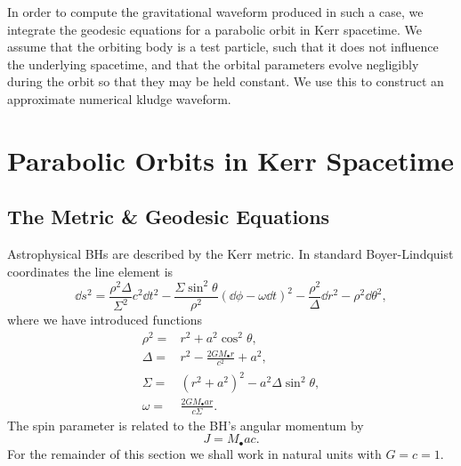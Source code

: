 In order to compute the gravitational waveform produced in such a case, we integrate the geodesic equations for a parabolic orbit in Kerr spacetime. We assume that the orbiting body is a test particle, such that it does not influence the underlying spacetime, and that the orbital parameters evolve negligibly during the orbit so that they may be held constant. We use this to construct an approximate numerical kludge waveform\cite{Babak2007}.

\section{Parabolic Orbits in Kerr Spacetime}

\subsection{The Metric \& Geodesic Equations}

Astrophysical BHs are described by the Kerr metric\cite{Kerr1963}. In standard Boyer-Lindquist coordinates the line element is\cite{Boyer1967, Hobson2006}
\begin{equation}
\dd s^2 = \frac{\rho^2 \Delta}{\Sigma^2}c^2\dd t^2 - \frac{\Sigma \sin^2 \theta}{\rho^2}\left(\dd \phi - \omega \dd t\right)^2 - \frac{\rho^2}{\Delta}\dd r^2 - \rho^2\dd \theta^2,
\end{equation}
where we have introduced functions
\begin{align}
\rho^2 = {} & r^2 + a^2\cos^2\theta,\\
\Delta = {} & r^2 - \frac{2GM_\bullet r}{c^2} + a^2,\\
\Sigma = {} & \left(r^2 +a^2\right)^2 - a^2\Delta\sin^2\theta,\\
\omega = {} & \frac{2GM_\bullet ar}{c\Sigma}.
\end{align}
The spin parameter is related to the BH's angular momentum by
\begin{equation}
J = M_\bullet ac.
\end{equation}
For the remainder of this section we shall work in natural units with $G = c = 1$.


